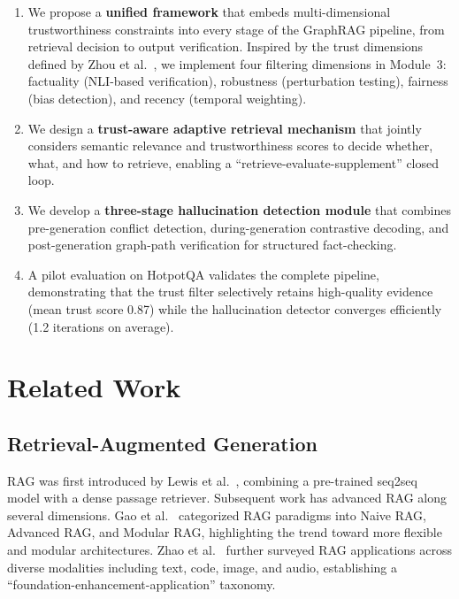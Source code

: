 \documentclass[11pt,a4paper]{article}
\begin{document}
\begin{enumerate}[leftmargin=*]
    \item We propose a \textbf{unified framework} that embeds multi-dimensional trustworthiness constraints into every stage of the GraphRAG pipeline, from retrieval decision to output verification. Inspired by the trust dimensions defined by Zhou et al.~\cite{zhou2024trustworthiness}, we implement four filtering dimensions in Module~3: factuality (NLI-based verification), robustness (perturbation testing), fairness (bias detection), and recency (temporal weighting).

    \item We design a \textbf{trust-aware adaptive retrieval mechanism} that jointly considers semantic relevance and trustworthiness scores to decide whether, what, and how to retrieve, enabling a ``retrieve-evaluate-supplement'' closed loop.

    \item We develop a \textbf{three-stage hallucination detection module} that combines pre-generation conflict detection, during-generation contrastive decoding, and post-generation graph-path verification for structured fact-checking.

    \item A pilot evaluation on HotpotQA validates the complete pipeline, demonstrating that the trust filter selectively retains high-quality evidence (mean trust score 0.87) while the hallucination detector converges efficiently (1.2 iterations on average).
\end{enumerate}

\section{Related Work}

\subsection{Retrieval-Augmented Generation}

RAG was first introduced by Lewis et al.~\cite{lewis2021retrievalaugmented}, combining a pre-trained seq2seq model with a dense passage retriever. Subsequent work has advanced RAG along several dimensions. Gao et al.~\cite{gao2024retrieval} categorized RAG paradigms into Naive RAG, Advanced RAG, and Modular RAG, highlighting the trend toward more flexible and modular architectures. Zhao et al.~\cite{zhao2024retrieval} further surveyed RAG applications across diverse modalities including text, code, image, and audio, establishing a ``foundation-enhancement-application'' taxonomy.
\end{document}
